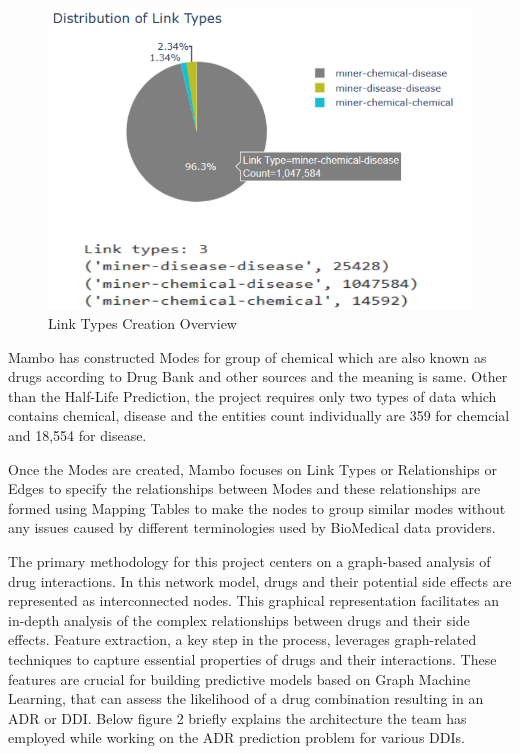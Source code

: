 \documentclass[journal,transmag]{J-NaNA}
\begin{document}
\\
\begin{figure}[htbp]
\centering
\includegraphics[width=\linewidth]{LinkeTypesCreation.png} 
\caption{Link Types Creation Overview}
\label{fig:mambo_architecture} %
\end{figure}
Mambo has constructed Modes for group of chemical which are also known as drugs according to Drug Bank and other sources and the meaning is same. Other than the Half-Life Prediction, the project requires only two types of data which contains chemical, disease and the entities count individually are 359 for chemcial and 18,554 for disease. 

Once the Modes are created, Mambo focuses on Link Types or Relationships or Edges to specify the relationships between Modes and these relationships are formed using Mapping Tables to make the nodes to group similar modes without any issues caused by different terminologies used by BioMedical data providers. 



The primary methodology for this project centers on a graph-based analysis of drug interactions. In this network model, drugs and their potential side effects are represented as interconnected nodes. This graphical representation facilitates an in-depth analysis of the complex relationships between drugs and their side effects. Feature extraction, a key step in the process, leverages graph-related techniques to capture essential properties of drugs and their interactions. These features are crucial for building predictive models based on Graph Machine Learning, that can assess the likelihood of a drug combination resulting in an ADR or DDI. Below figure 2 briefly explains the architecture the team has employed while working on the ADR prediction problem for various DDIs.
\end{document}
